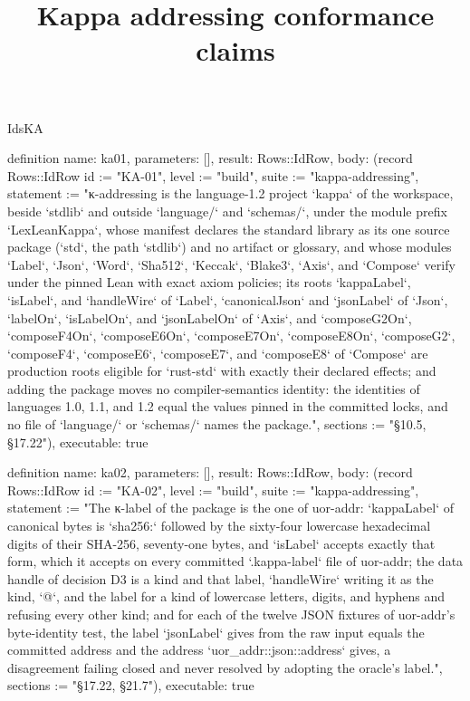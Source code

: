 \begin{lexlean}{IdsKA}
\title{Kappa addressing conformance claims}
\begin{semanticmodule}
definition{
  name: ka01,
  parameters: [],
  result: Rows::IdRow,
  body: (record Rows::IdRow {id := "KA-01", level := "build", suite := "kappa-addressing", statement := "κ-addressing is the language-1.2 project `kappa` of the workspace, beside `stdlib` and outside `language/` and `schemas/`, under the module prefix `LexLeanKappa`, whose manifest declares the standard library as its one source package (`std`, the path `stdlib`) and no artifact or glossary, and whose modules `Label`, `Json`, `Word`, `Sha512`, `Keccak`, `Blake3`, `Axis`, and `Compose` verify under the pinned Lean with exact axiom policies; its roots `kappaLabel`, `isLabel`, and `handleWire` of `Label`, `canonicalJson` and `jsonLabel` of `Json`, `labelOn`, `isLabelOn`, and `jsonLabelOn` of `Axis`, and `composeG2On`, `composeF4On`, `composeE6On`, `composeE7On`, `composeE8On`, `composeG2`, `composeF4`, `composeE6`, `composeE7`, and `composeE8` of `Compose` are production roots eligible for `rust-std` with exactly their declared effects; and adding the package moves no compiler-semantics identity: the identities of languages 1.0, 1.1, and 1.2 equal the values pinned in the committed locks, and no file of `language/` or `schemas/` names the package.", sections := "§10.5, §17.22"}),
  executable: true
}

definition{
  name: ka02,
  parameters: [],
  result: Rows::IdRow,
  body: (record Rows::IdRow {id := "KA-02", level := "build", suite := "kappa-addressing", statement := "The κ-label of the package is the one of uor-addr: `kappaLabel` of canonical bytes is `sha256:` followed by the sixty-four lowercase hexadecimal digits of their SHA-256, seventy-one bytes, and `isLabel` accepts exactly that form, which it accepts on every committed `.kappa-label` file of uor-addr; the data handle of decision D3 is a kind and that label, `handleWire` writing it as the kind, `@`, and the label for a kind of lowercase letters, digits, and hyphens and refusing every other kind; and for each of the twelve JSON fixtures of uor-addr's byte-identity test, the label `jsonLabel` gives from the raw input equals the committed address and the address `uor_addr::json::address` gives, a disagreement failing closed and never resolved by adopting the oracle's label.", sections := "§17.22, §21.7"}),
  executable: true
}


\end{semanticmodule}
\end{lexlean}
